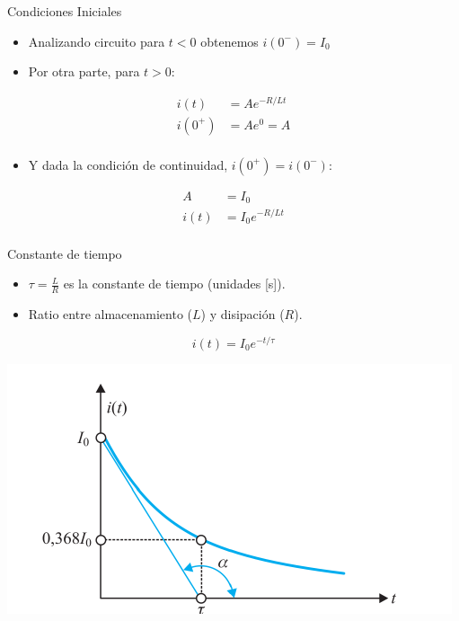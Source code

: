 \documentclass[xcolor={usenames,svgnames,dvipsnames}]{beamer}
\begin{document}
\begin{frame}[label={sec:org00c3fa1}]{Condiciones Iniciales}
\begin{itemize}
\item Analizando circuito para \(t < 0\) obtenemos  \(i(0^-) = I_0\)
\item Por otra parte, para \(t > 0\):
\end{itemize}
\begin{align*}
  i(t) &= A e^{-R/L t}\\
  i(0^+) &= A e^0 = A\\
\end{align*}

\begin{itemize}
\item Y dada la condición de continuidad, \(i(0^+) = i(0^-)\):
\end{itemize}
\begin{align*}
  A &= I_0\\
  i(t) &= I_0 e^{-R/L t}\\
\end{align*}
\end{frame}


\begin{frame}[label={sec:org2b1fc21}]{Constante de tiempo}
\begin{itemize}
\item \(\tau = \frac{L}{R}\) es la constante de tiempo (unidades [s]).
\item Ratio entre almacenamiento (\(L\)) y disipación (\(R\)).
\end{itemize}

\[
  i(t) = I_0 e^{-t/\tau}  
\]

\begin{center}
\includegraphics[width=.9\linewidth]{figs/RespuestaNatural_RL.pdf}
\end{center}
\end{frame}
\end{document}

